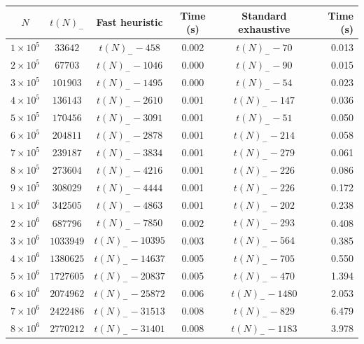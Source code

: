 \documentclass[10pt,a4paper,reqno]{amsart}
\numberwithin{equation}{section}
\theoremstyle{plain}
\theoremstyle{definition}
\begin{document}
\begin{table}[htp!]
  \centering
  \begin{tabular}{|c|c|c|c|c|r|}
  \hline
\rule{0pt}{11pt}  $N$ & $t(N)_-$ & Fast heuristic & Time (s) & Standard exhaustive & Time (s) \\
  \hline
\rule{0pt}{12pt}$1 \times 10^5$ & $\num{33642}$ & $t(N)_- - \num{458}$ & 0.002 & $t(N)_- - \num{70}$ & 0.013 \\
$2 \times 10^5$ & $\num{67703}$ & $t(N)_- - \num{1046}$ & 0.000 & $t(N)_- - \num{90}$ & 0.015 \\
$3 \times 10^5$ & $\num{101903}$ & $t(N)_- - \num{1495}$ & 0.000 & $t(N)_- - \num{54}$ & 0.023 \\
$4 \times 10^5$ & $\num{136143}$ & $t(N)_- - \num{2610}$ & 0.001 & $t(N)_- - \num{147}$ & 0.036 \\
$5 \times 10^5$ & $\num{170456}$ & $t(N)_- - \num{3091}$ & 0.001 & $t(N)_- - \num{51}$ & 0.050 \\
$6 \times 10^5$ & $\num{204811}$ & $t(N)_- - \num{2878}$ & 0.001 & $t(N)_- - \num{214}$ & 0.058 \\
$7 \times 10^5$ & $\num{239187}$ & $t(N)_- - \num{3834}$ & 0.001 & $t(N)_- - \num{279}$ & 0.061 \\
$8 \times 10^5$ & $\num{273604}$ & $t(N)_- - \num{4216}$ & 0.001 & $t(N)_- - \num{226}$ & 0.086 \\
$9 \times 10^5$ & $\num{308029}$ & $t(N)_- - \num{4444}$ & 0.001 & $t(N)_- - \num{226}$ & 0.172 \\\hline
\rule{0pt}{12pt}$1 \times 10^6$ & $\num{342505}$ & $t(N)_- - \num{4863}$ & 0.001 & $t(N)_- - \num{202}$ & 0.238 \\
$2 \times 10^6$ & $\num{687796}$ & $t(N)_- - \num{7850}$ & 0.002 & $t(N)_- - \num{293}$ & 0.408 \\
$3 \times 10^6$ & $\num{1033949}$ & $t(N)_- - \num{10395}$ & 0.003 & $t(N)_- - \num{564}$ & 0.385 \\
$4 \times 10^6$ & $\num{1380625}$ & $t(N)_- - \num{14637}$ & 0.005 & $t(N)_- - \num{705}$ & 0.550 \\
$5 \times 10^6$ & $\num{1727605}$ & $t(N)_- - \num{20837}$ & 0.005 & $t(N)_- - \num{470}$ & 1.394 \\
$6 \times 10^6$ & $\num{2074962}$ & $t(N)_- - \num{25872}$ & 0.006 & $t(N)_- - \num{1480}$ & 2.053 \\
$7 \times 10^6$ & $\num{2422486}$ & $t(N)_- - \num{31513}$ & 0.008 & $t(N)_- - \num{829}$ & 6.479 \\
$8 \times 10^6$ & $\num{2770212}$ & $t(N)_- - \num{31401}$ & 0.008 & $t(N)_- - \num{1183}$ & 3.978 \\

\end{tabular}
\end{table}
\end{document}
